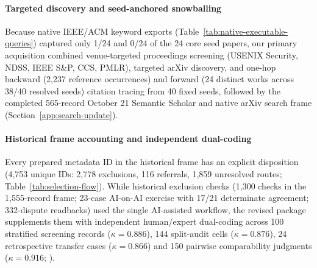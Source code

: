 

\paragraph{Targeted discovery and seed-anchored snowballing}
Because native IEEE/ACM keyword exports (Table~\ref{tab:native-executable-queries}) captured only 1/24 and 0/24 of the 24 core seed papers, our primary acquisition combined venue-targeted proceedings screening (USENIX Security, NDSS, IEEE S\&P, CCS, PMLR), targeted arXiv discovery, and one-hop backward (2,237 reference occurrences) and forward (24 distinct works across 38/40 resolved seeds) citation tracing from 40 fixed seeds, followed by the completed 565-record October 21 Semantic Scholar and native arXiv search frame (Section~\ref{app:search-update}).

\paragraph{Historical frame accounting and independent dual-coding}
Every prepared metadata ID in the historical frame has an explicit disposition (4,753 unique IDs: 2,778 exclusions, 116 referrals, 1,859 unresolved routes; Table~\ref{tab:selection-flow}). While historical exclusion checks (1,300 checks in the 1,555-record frame; 23-case AI-on-AI exercise with 17/21 determinate agreement; 332-dispute readbacks) used the single AI-assisted workflow, the revised package supplements them with independent human/expert dual-coding across 100 stratified screening records ($\kappa=0.886$), 144 split-audit cells ($\kappa=0.876$), 24 retrospective transfer cases ($\kappa=0.866$) and 150 pairwise comparability judgments ($\kappa=0.916$; ).
